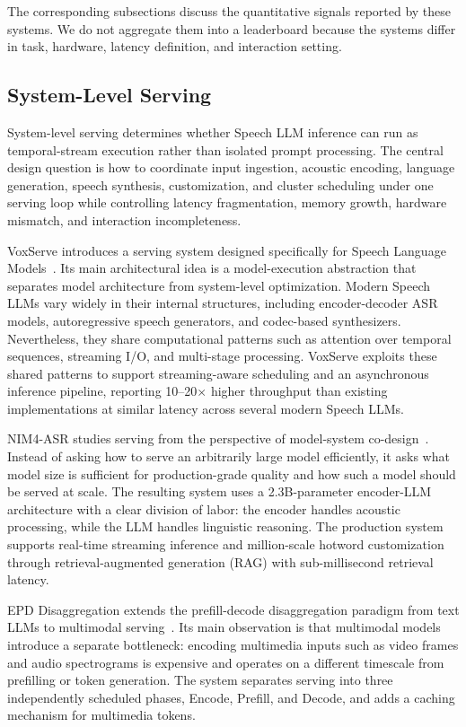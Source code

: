 The corresponding subsections discuss the quantitative signals reported by these systems. We do not aggregate them into a leaderboard because the systems differ in task, hardware, latency definition, and interaction setting.

\subsection{System-Level Serving}

System-level serving determines whether Speech LLM inference can run as temporal-stream execution rather than isolated prompt processing. The central design question is how to coordinate input ingestion, acoustic encoding, language generation, speech synthesis, customization, and cluster scheduling under one serving loop while controlling latency fragmentation, memory growth, hardware mismatch, and interaction incompleteness.

VoxServe introduces a serving system designed specifically for Speech Language Models~\citep{kamahori2026voxserve}. Its main architectural idea is a model-execution abstraction that separates model architecture from system-level optimization. Modern Speech LLMs vary widely in their internal structures, including encoder-decoder ASR models, autoregressive speech generators, and codec-based synthesizers. Nevertheless, they share computational patterns such as attention over temporal sequences, streaming I/O, and multi-stage processing. VoxServe exploits these shared patterns to support streaming-aware scheduling and an asynchronous inference pipeline, reporting 10--20$\times$ higher throughput than existing implementations at similar latency across several modern Speech LLMs.

NIM4-ASR studies serving from the perspective of model-system co-design~\citep{xie2026nim4asr}. Instead of asking how to serve an arbitrarily large model efficiently, it asks what model size is sufficient for production-grade quality and how such a model should be served at scale. The resulting system uses a 2.3B-parameter encoder-LLM architecture with a clear division of labor: the encoder handles acoustic processing, while the LLM handles linguistic reasoning. The production system supports real-time streaming inference and million-scale hotword customization through retrieval-augmented generation (RAG) with sub-millisecond retrieval latency.

EPD Disaggregation extends the prefill-decode disaggregation paradigm from text LLMs to multimodal serving~\citep{singh2025epd}. Its main observation is that multimodal models introduce a separate bottleneck: encoding multimedia inputs such as video frames and audio spectrograms is expensive and operates on a different timescale from prefilling or token generation. The system separates serving into three independently scheduled phases, Encode, Prefill, and Decode, and adds a caching mechanism for multimedia tokens.


